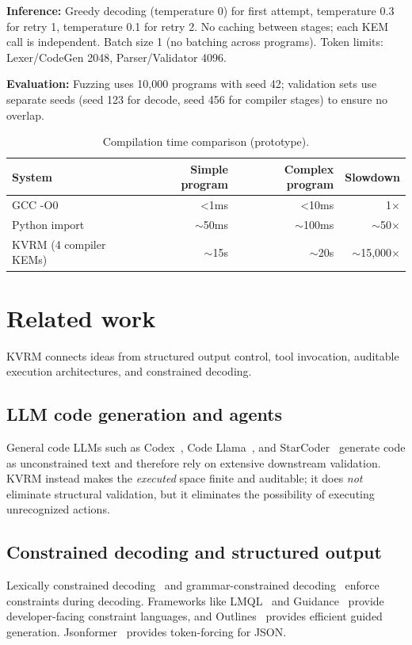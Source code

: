 \documentclass[11pt]{article}
\begin{document}
\textbf{Inference:} Greedy decoding (temperature 0) for first attempt, temperature 0.3 for retry 1, temperature 0.1 for retry 2.
No caching between stages; each KEM call is independent.
Batch size 1 (no batching across programs).
Token limits: Lexer/CodeGen 2048, Parser/Validator 4096.

\textbf{Evaluation:} Fuzzing uses 10,000 programs with seed 42; validation sets use separate seeds (seed 123 for decode, seed 456 for compiler stages) to ensure no overlap.

\begin{table}[h]
\centering
\caption{Compilation time comparison (prototype).}
\label{tab:compile_time}
\begin{tabular}{lrrr}
\toprule
System & Simple program & Complex program & Slowdown \\
\midrule
GCC -O0 & <1ms & <10ms & 1$\times$ \\
Python import & $\sim$50ms & $\sim$100ms & $\sim$50$\times$ \\
KVRM (4 compiler KEMs) & $\sim$15s & $\sim$20s & $\sim$15{,}000$\times$ \\
\bottomrule
\end{tabular}
\end{table}

\section{Related work}\label{sec:related}
KVRM connects ideas from structured output control, tool invocation, auditable execution architectures, and constrained decoding.

\subsection{LLM code generation and agents}
General code LLMs such as Codex~\cite{chen2021codex}, Code Llama~\cite{roziere2023codellama}, and StarCoder~\cite{li2023starcoder} generate code as unconstrained text and therefore rely on extensive downstream validation.
KVRM instead makes the \emph{executed} space finite and auditable; it does \emph{not} eliminate structural validation, but it eliminates the possibility of executing unrecognized actions.

\subsection{Constrained decoding and structured output}
Lexically constrained decoding~\cite{hokamp2017grid,post2018vdba} and grammar-constrained decoding~\cite{geng2023gcd} enforce constraints during decoding.
Frameworks like LMQL~\cite{beurer2023lmql} and Guidance~\cite{guidance} provide developer-facing constraint languages, and Outlines~\cite{willard2023outlines} provides efficient guided generation.
Jsonformer~\cite{jsonformer} provides token-forcing for JSON.
\end{document}

